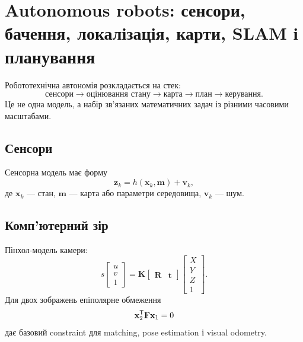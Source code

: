 \chapter{Autonomous robots: сенсори, бачення, локалізація, карти, SLAM і планування}
\label{chap:autonomous-robots-stack}


Робототехнічна автономія розкладається на стек:
\begin{equation}
 \text{сенсори}\rightarrow \text{оцінювання стану}\rightarrow \text{карта}\rightarrow \text{план}\rightarrow \text{керування}.
\end{equation}
Це не одна модель, а набір зв'язаних математичних задач із різними часовими масштабами.

\section{Сенсори}

Сенсорна модель має форму
\begin{equation}
 \mathbf{z}_k=h(\mathbf{x}_k,\mathbf{m})+\mathbf{v}_k,
\end{equation}
де $\mathbf{x}_k$ --- стан, $\mathbf{m}$ --- карта або параметри середовища, $\mathbf{v}_k$ --- шум.

\section{Комп'ютерний зір}

Пінхол-модель камери:
\begin{equation}
 s\begin{bmatrix}u\\v\\1\end{bmatrix}=
 \mathbf{K}\begin{bmatrix}\mathbf{R}&\mathbf{t}\end{bmatrix}
 \begin{bmatrix}X\\Y\\Z\\1\end{bmatrix}.
\end{equation}
Для двох зображень епіполярне обмеження
\begin{equation}
 \mathbf{x}_2^{\mathsf{T}}\mathbf{F}\mathbf{x}_1=0
\end{equation}
дає базовий constraint для matching, pose estimation і visual odometry.

